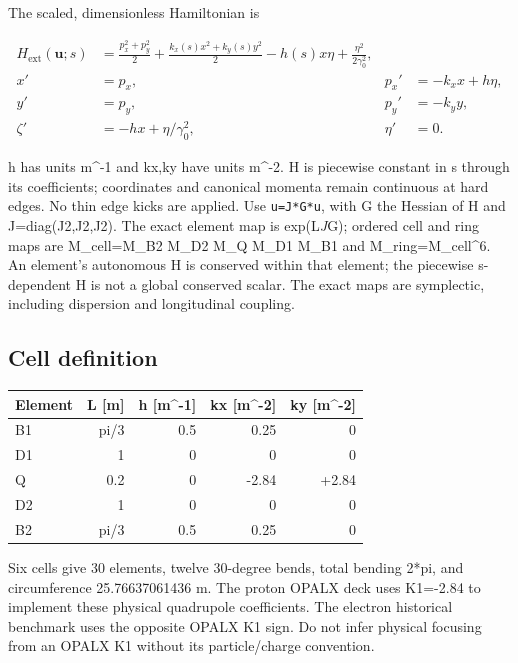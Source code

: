 \documentclass[
  11pt,
  a4paper,
]{article}
\newcounter{none} %
\begin{document}
The scaled, dimensionless Hamiltonian is

\[
\begin{aligned}
H_{\mathrm{ext}}(\mathbf u;s)&=\frac{p_x^2+p_y^2}{2}
 +\frac{k_x(s)x^2+k_y(s)y^2}{2}-h(s)x\eta+\frac{\eta^2}{2\gamma_0^2},\\
x'&=p_x,&p_x'&=-k_xx+h\eta,\\
y'&=p_y,&p_y'&=-k_yy,\\
\zeta'&=-hx+\eta/\gamma_0^2,&\eta'&=0.
\end{aligned}
\]

h has units m\^{}-1 and kx,ky have units m\^{}-2. H is piecewise
constant in s through its coefficients; coordinates and canonical
momenta remain continuous at hard edges. No thin edge kicks are applied.
Use \texttt{u\textquotesingle{}=J*G*u}, with G the Hessian of H and
J=diag(J2,J2,J2). The exact element map is exp(L\emph{J}G); ordered cell
and ring maps are M\_cell=M\_B2 M\_D2 M\_Q M\_D1 M\_B1 and
M\_ring=M\_cell\^{}6. An element's autonomous H is conserved within that
element; the piecewise s-dependent H is not a global conserved scalar.
The exact maps are symplectic, including dispersion and longitudinal
coupling.

\subsection{Cell definition}\label{cell-definition}

{\def\LTcaptype{none} %
\begin{longtable}[]{@{}lrrrr@{}}
\toprule\noalign{}
Element & L {[}m{]} & h {[}m\^{}-1{]} & kx {[}m\^{}-2{]} & ky
{[}m\^{}-2{]} \\
\midrule\noalign{}
\endhead
\bottomrule\noalign{}
\endlastfoot
B1 & pi/3 & 0.5 & 0.25 & 0 \\
D1 & 1 & 0 & 0 & 0 \\
Q & 0.2 & 0 & -2.84 & +2.84 \\
D2 & 1 & 0 & 0 & 0 \\
B2 & pi/3 & 0.5 & 0.25 & 0 \\
\end{longtable}
}

Six cells give 30 elements, twelve 30-degree bends, total bending 2*pi,
and circumference 25.76637061436 m. The proton OPALX deck uses K1=-2.84
to implement these physical quadrupole coefficients. The electron
historical benchmark uses the opposite OPALX K1 sign. Do not infer
physical focusing from an OPALX K1 without its particle/charge
convention.
\end{document}
